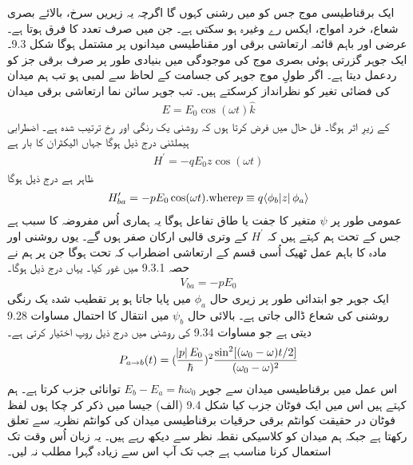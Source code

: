 \documentclass[leqno, b5paper]{khalid-urdu-book}
\begin{document}
ایک برقناطیسی موج جس کو میں رشنی کہوں گا اگرچہ یہ زیریں سرخ، بالائے بصری شعاع، خرد امواج، ایکس رے وغیرہ ہو سکتی ہے۔ جن میں صرف تعدد کا فرق ہوتا ہے۔ عرضی اور باہم قائمہ ارتعاشی برقی اور مقناطیسی میدانوں پر مشتمل ہوگا شکل \num{9.3}۔ ایک جوہر گزرتی ہوئی بصری موج کی موجودگی میں بنیادی طور پر صرف برقی جز کو ردعمل دیتا ہے۔ اگر طولِ موج جوہر کی جسامت کے لحاظ سے لمبی ہو تب ہم میدان کی فضائی تغیر کو نظرانداز کرسکتے ہیں۔ تب جوہر سائن نما ارتعاشی برقی میدان
\begin{align}
	E = E_0\cos(\omega t)\hat{k}
\end{align}
کے زیرِ اثر ہوگا۔ فل حال میں فرض کرتا ہوں کہ روشنی یک رنگی اور  رخ ترتیب شدہ ہے۔ اضطرابی ہیملٹنی درج ذیل ہوگا جہاں  الیکٹران کا بار ہے 
\begin{align}
	H^\prime =-qE_0z\cos(\omega t)
\end{align}	
ظاہر ہے درج ذیل ہوگا
\begin{align}
	H^{\prime}_{ba} =-pE_0 \cos(\omega t). \text{where} p \equiv q\langle \phi_b \abs{z}\phi_a\rangle
\end{align}
عمومی طور پر \(\psi\) متغیر  کا جفت یا طاق تفاعل ہوگا یہ ہماری اُس مفروضہ کا سبب ہے جس کے تحت ہم کہتے ہیں کہ \(H^\prime\) کے وتری قالبی ارکان صفر ہوں گے۔ یوں روشنی اور مادہ کا باہم عمل ٹھیک اُسی قسم کے ارتعاشی اضطراب کہ تحت ہوگا جن پر ہم نے حصہ 9.3.1 میں غور کیا۔ یہاں درج ذیل ہوگا۔  
\begin{align}
	V_{ba} = -pE_0
\end{align}
ایک جوہر جو ابتدائی طور پر زیری حال \(\phi_a\) میں پایا جاتا ہو پر تقطیب شدہ یک رنگی روشنی کی شعاع ڈالی جاتی ہے۔ بالائی حال \(\psi_b\) میں انتقال کا احتمال مساوات \num{9.28} دیتی ہے جو مساوات \num{9.34} کی روشنی میں درج ذیل روپ اختیار کرتی ہے۔
\begin{align}
	P_{a\rightarrow b} (t) = (\frac{\abs{p}E_0}{\hbar})^2 \frac{\sin^2[(\omega_0 - \omega)t/2]}{(\omega_0 - \omega)^2}
\end{align}
اس عمل میں برقناطیسی میدان سے جوہر \(E_b - E_a = \hbar\omega_0\) توانائی جزب کرتا ہے۔ ہم کہتے ہیں اس میں ایک فوٹان جزب کیا شکل \num{9.4} (الف) جیسا میں ذکر کر چکا ہوں لفظ فوٹان در حقیقت کوانٹم برقی حرقیات برقناطیسی میدان کی کوانٹم نظریہ سے تعلق رکھتا ہے جبکہ ہم میدان کو کلاسیکی نقطہ نظر سے دیکھ رہے ہیں۔ یہ زبان اُس وقت تک استعمال کرنا مناسب ہے جب تک آپ اس سے زیادہ گہرا مطلب نہ لیں۔
\end{document}
